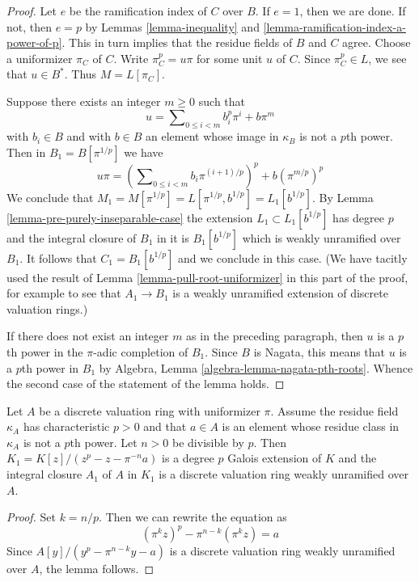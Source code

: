 \begin{proof}
Let $e$ be the ramification index of $C$ over $B$. If $e = 1$, then we are
done. If not, then $e = p$ by Lemmas \ref{lemma-inequality} and
\ref{lemma-ramification-index-a-power-of-p}.
This in turn implies that the residue fields of $B$ and $C$ agree.
Choose a uniformizer $\pi_C$ of $C$.
Write $\pi_C^p = u \pi$ for some unit $u$ of $C$.
Since $\pi_C^p \in L$, we see that $u \in B^*$. Thus $M = L[\pi_C]$.

\medskip\noindent
Suppose there exists an integer $m \geq 0$ such that
$$
u = \sum\nolimits_{0 \leq i < m} b_i^p \pi^i + b \pi^m
$$
with $b_i \in B$ and with $b \in B$ an element whose image in $\kappa_B$
is not a $p$th power. Then in $B_1 = B[\pi^{1/p}]$ we have
$$
u \pi = \left(\sum\nolimits_{0 \leq i < m} b_i \pi^{(i + 1)/p}\right)^p +
b (\pi^{m/p})^p
$$
We conclude that $M_1 = M[\pi^{1/p}] = L[\pi^{1/p}, b^{1/p}] = L_1[b^{1/p}]$.
By Lemma \ref{lemma-pre-purely-inseparable-case} the extension
$L_1 \subset L_1[b^{1/p}]$ has degree $p$ and
the integral closure of $B_1$ in it is $B_1[b^{1/p}]$
which is weakly unramified over $B_1$.
It follows that $C_1 = B_1[b^{1/p}]$ and we conclude in this case.
(We have tacitly used the result of Lemma \ref{lemma-pull-root-uniformizer}
in this part of the proof, for example to see that $A_1 \to B_1$ is
a weakly unramified extension of discrete valuation rings.)

\medskip\noindent
If there does not exist an integer $m$ as in the preceding paragraph,
then $u$ is a $p$th power in the $\pi$-adic completion of $B_1$.
Since $B$ is Nagata, this means that $u$ is a $p$th power in $B_1$
by Algebra, Lemma \ref{algebra-lemma-nagata-pth-roots}.
Whence the second case of the statement of the lemma holds.
\end{proof}

\begin{lemma}
\label{lemma-pre-characteristic-p-case}
Let $A$ be a discrete valuation ring with uniformizer $\pi$.
Assume the residue field $\kappa_A$ has characteristic $p > 0$
and that $a \in A$ is an element whose residue class in $\kappa_A$
is not a $p$th power. Let $n > 0$ be divisible by $p$.
Then $K_1 = K[z]/(z^p - z - \pi^{-n}a)$ is a degree $p$ Galois extension
of $K$ and the integral closure $A_1$ of $A$ in $K_1$ is a discrete
valuation ring weakly unramified over $A$.
\end{lemma}

\begin{proof}
Set $k = n/p$. Then we can rewrite the equation as
$$
(\pi^kz)^p - \pi^{n - k} (\pi^kz) = a
$$
Since $A[y]/(y^p - \pi^{n - k}y - a)$ is a discrete valuation ring
weakly unramified over $A$, the lemma follows.
\end{proof}

